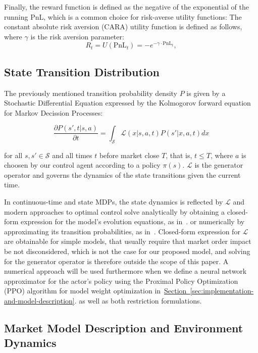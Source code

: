 Finally, the reward function is defined as the negative of the exponential of the running PnL, which is a common choice for risk-averse utility functions:
The constant absolute risk aversion (CARA) utility function is defined as follows, where \( \gamma \) is the risk aversion parameter:
\[
    R_t = U(\text{PnL}_t) = -e^{-\gamma \cdot \text{PnL}_t},
\]

\subsection{State Transition Distribution}
\label{subsec:state-transition-distribution}

The previously mentioned transition probability density $P$ is given by a Stochastic Differential Equation expressed by the Kolmogorov forward equation for Markov Decission Processes:

\begin{equation}
    \label{eq:equation2}
    \frac{\partial P(s', t | s, a)}{\partial t}  = \int_{\mathcal{S}} \mathcal{L}(x | s, a, t) P(s'| x, a, t) dx
\end{equation}

for all $s, s' \in \mathcal{S}$ and all times $t$ before market close $T$, that is, $t \le T$,
where $a$ is choosen by our control agent according to a policy $\pi (s)$.
$\mathcal{L}$ is the generator operator and governs the dynamics of the state transitions given the current time.

In continuous-time and state MDPs, the state dynamics is reflected by $\mathcal{L}$ and modern approaches to optimal control
solve analytically by obtaining a closed-form expression for the model's evolution equations, as in~\citet{Avellaneda2008, Gueant2017}.
or numerically by approximating its transition probabilities, as in~\citet{Gueant2022, Selser2021a, FalcesMarin2022}.
Closed-form expression for $\mathcal{L}$ are obtainable for simple models, that usually require that market order impact be not disconsidered,
which is not the case for our proposed model, and solving for the generator operator is therefore outside the scope of this paper.
A numerical approach will be used furthermore when we define a neural network approximator for the actor's policy using the
Proximal Policy Optimization (PPO) algorithm for model weight optimization in~\hyperref[sec:implementation-and-models]{Section~\ref*{sec:implementation-and-model-description}}.
as well as both restriction formulations.

\subsection{Market Model Description and Environment Dynamics}
\label{subsec:market-model-description-and-environment-dynamics}

